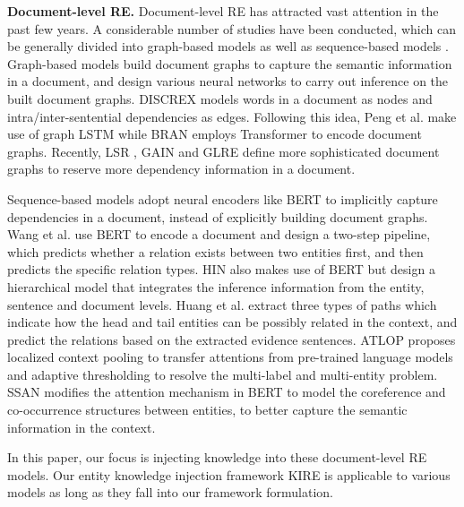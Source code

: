 \documentclass[runningheads]{llncs}
\begin{document}
\textbf{Document-level RE.} Document-level RE has attracted vast attention in the past few years. 
A considerable number of studies have been conducted, which can be generally divided into graph-based models \cite{quirk2017distant,peng2017cross,verga2018simultaneously,nan2020reasoning,wang2020global,zeng2020double,xu2021document} as well as sequence-based models \cite{wang2019fine,tang2020hin,huang2021three,zhou2021document,xu2021entity}.
Graph-based models build document graphs to capture the semantic information in a document, and design various neural networks to carry out inference on the built document graphs.
DISCREX \cite{quirk2017distant} models words in a document as nodes and intra/inter-sentential dependencies as edges.
Following this idea, Peng et al. \cite{peng2017cross} make use of graph LSTM while BRAN \cite{verga2018simultaneously} employs Transformer to encode document graphs.
Recently, LSR \cite{nan2020reasoning}, GAIN \cite{zeng2020double} and GLRE \cite{wang2020global} define more sophisticated document graphs to reserve more dependency information in a document.

Sequence-based models adopt neural encoders like BERT to implicitly capture dependencies in a document, instead of explicitly building document graphs.
Wang et al. \cite{wang2019fine} use BERT to encode a document and design a two-step pipeline, which predicts whether a relation exists between two entities first, and then predicts the specific relation types.
HIN \cite{tang2020hin} also makes use of BERT but design a hierarchical model that integrates the inference information from the entity, sentence and document levels.
Huang et al. \cite{huang2021three} extract three types of paths which indicate how the head and tail entities can be possibly related in the context, and predict the relations based on the extracted evidence sentences.
ATLOP \cite{zhou2021document} proposes localized context pooling to transfer attentions from pre-trained language models and adaptive thresholding to resolve the multi-label and multi-entity problem.
SSAN \cite{xu2021entity} modifies the attention mechanism in BERT to model the coreference and co-occurrence structures between entities, to better capture the semantic information in the context.

In this paper, our focus is injecting knowledge into these document-level RE models. 
Our entity knowledge injection framework KIRE is applicable to various models as long as they fall into our framework formulation.
\end{document}
